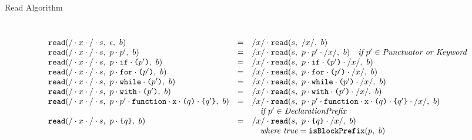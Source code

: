 \documentclass[preprint,10pt]{sigplanconf}
\begin{document}
\begin{displayfigure*}{\label{fig:read}Read Algorithm}
\[\begin{array}{lcll}
    \\ \\
    \texttt{read}(/\cdot x \cdot /\cdot s,~\epsilon,~b)
    &=&
    /x/ \cdot 
      \texttt{read}(s,~/x/,~b)
   
    \\
    \texttt{read}(/\cdot x \cdot /\cdot s,~p \cdot p',~b)
    &=&
    /x/ \cdot 
      \texttt{read}(s,~
        p \cdot p' \cdot /x/
      ,~b)
   
    \quad \textit{if}~p' \in \textit{Punctuator or Keyword}
    \\
    \texttt{read}(/\cdot x \cdot /\cdot s,~
      p \cdot \texttt{if} \cdot \texttt{(}p'\texttt{)}
    ,~b)
    &=&
    /x/ \cdot 
      \texttt{read}(s,~p \cdot \texttt{if} \cdot \texttt{(}p'\texttt{)} \cdot /x/,~b)
   
    \\
    \texttt{read}(/\cdot x \cdot /\cdot s,~
      p \cdot \texttt{for} \cdot \texttt{(}p'\texttt{)}
    ,~b)
    &=&
    /x/ \cdot 
      \texttt{read}(s,~p \cdot \texttt{for} \cdot \texttt{(}p'\texttt{)} \cdot /x/,~b)
   
    \\
    \texttt{read}(/\cdot x \cdot /\cdot s,~
      p \cdot \texttt{while} \cdot \texttt{(}p'\texttt{)}
    ,~b)
    &=&
    /x/ \cdot 
      \texttt{read}(s,~p \cdot \texttt{while} \cdot \texttt{(}p'\texttt{)} \cdot /x/,~b)
   
    \\
    \texttt{read}(/\cdot x \cdot /\cdot s,~
      p \cdot \texttt{with} \cdot \texttt{(}p'\texttt{)}
    ,~b)
    &=&
    /x/ \cdot 
      \texttt{read}(s,~p \cdot \texttt{with} \cdot \texttt{(}p'\texttt{)} \cdot /x/,~b)
   
    \\
    \texttt{read}(/\cdot x \cdot /\cdot s,~
      p \cdot p' \cdot \texttt{function} \cdot \texttt{x} 
      \cdot \texttt{(}q\texttt{)} \cdot \texttt{\{}q'\texttt{\}}
    ,~b)
    &=&
    /x/ \cdot 
      \texttt{read}(s,~
      p \cdot p' 
      \cdot \texttt{function} \cdot \texttt{x} \cdot 
      \texttt{(}q\texttt{)} \cdot \texttt{\{}q'\texttt{\}}\cdot /x/
      ,~b)
    \\
    && \quad \textit{if}~p' \in \textit{DeclarationPrefix}
    \\
    \texttt{read}(/\cdot x \cdot / \cdot s,~
      p \cdot \texttt{\{}q\texttt{\}}
    ,~b)
    &=&
    /x/ \cdot 
      \texttt{read}(s,~
        p \cdot \texttt{\{}q\texttt{\}}\cdot /x/
      ,~b)
   
    \\
    && \quad \textit{where true} = \texttt{isBlockPrefix}(p,~b) \\
    

    \\ \\
    

\end{array}\]
\end{displayfigure*}
\end{document}
